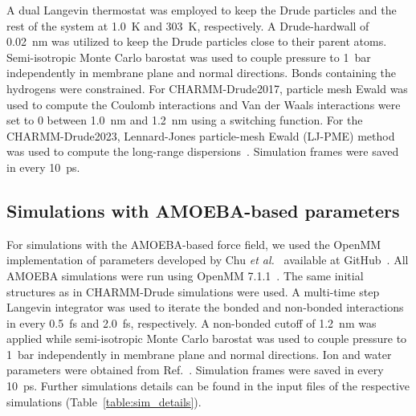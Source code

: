 \documentclass[journal=jctcce,manuscript=article,layout=singlecolumn]{achemso}
\begin{document}
A dual Langevin thermostat was employed to keep the Drude particles and the rest of the system at 1.0~K and 303~K, respectively. A Drude-hardwall of 0.02~nm was utilized to keep the Drude particles close to their parent atoms. Semi-isotropic Monte Carlo barostat was used to couple pressure to 1~bar independently in membrane plane and normal directions. %
Bonds containing the hydrogens were constrained. For CHARMM-Drude2017, particle mesh Ewald was used to compute the Coulomb interactions and Van der Waals interactions were set to 0 between 1.0~nm and 1.2~nm using a switching function. For the CHARMM-Drude2023, Lennard-Jones particle-mesh Ewald (LJ-PME) method was used to compute the long-range dispersions~\cite{wennberg2013lennard}. Simulation frames were saved in every 10~ps.


\subsection{Simulations with AMOEBA-based parameters}

For simulations with the AMOEBA-based force field, we used the OpenMM implementation of parameters developed by Chu \textit{et al.}~\cite{chu2018polarizable} available at GitHub~\cite{amoebagithub,klesse2020induced}. All AMOEBA simulations were run using OpenMM 7.1.1~\cite{eastman2017openmm}. The same initial structures as in CHARMM-Drude simulations were used. A multi-time step Langevin integrator was used to iterate the bonded and non-bonded interactions in every 0.5~fs and 2.0~fs, respectively. A non-bonded cutoff of 1.2~nm was applied while semi-isotropic Monte Carlo barostat was used to couple pressure to 1~bar independently in membrane plane and normal directions. Ion and water parameters were obtained from Ref.~.
Simulation frames were saved in every 10~ps. Further simulations details can be found in the input files of the respective simulations (Table~\ref{table:sim_details}).
\end{document}
